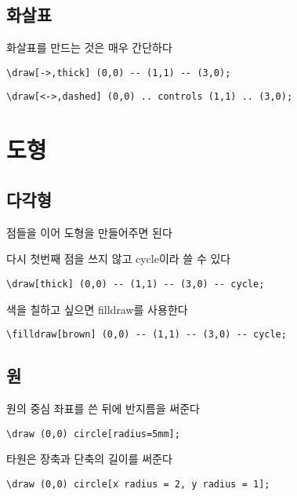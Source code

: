 \documentclass[12pt]{beamer}
\begin{document}
\subsection{화살표}
\begin{frame}[fragile]{\secname}{\subsecname}
	화살표를 만드는 것은 매우 간단하다
	\begin{lstlisting}
\draw[->,thick] (0,0) -- (1,1) -- (3,0);
	\end{lstlisting}
	
	
	\begin{lstlisting}
\draw[<->,dashed] (0,0) .. controls (1,1) .. (3,0);
	\end{lstlisting}
	

\end{frame}

\section{도형}
\subsection{다각형}
\begin{frame}[fragile]{\secname}{\subsecname}
	점들을 이어 도형을 만들어주면 된다
	
	다시 첫번째 점을 쓰지 않고 cycle이라 쓸 수 있다
	\begin{lstlisting}
\draw[thick] (0,0) -- (1,1) -- (3,0) -- cycle;
	\end{lstlisting}
	
	
	색을 칠하고 싶으면 filldraw를 사용한다
	
	\begin{lstlisting}
\filldraw[brown] (0,0) -- (1,1) -- (3,0) -- cycle;
	\end{lstlisting}
	
	
\end{frame}
\subsection{원}
\begin{frame}[fragile]{\secname}{\subsecname}
	원의 중심 좌표를 쓴 뒤에 반지름을 써준다
	
	\begin{lstlisting}
\draw (0,0) circle[radius=5mm];
	\end{lstlisting}
	
	
	타원은 장축과 단축의 길이를 써준다
	\begin{lstlisting}
\draw (0,0) circle[x radius = 2, y radius = 1];
	\end{lstlisting}
	
\end{frame}
\end{document}
